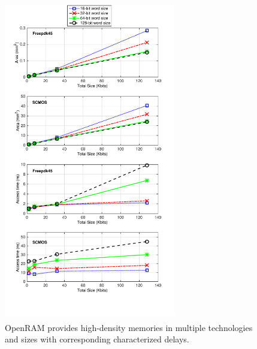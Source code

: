 \begin{figure}[tb]
\begin{center}
\centering
\includegraphics[width=7.5cm , height=14cm]{./figs/Results2.pdf}
  \caption{OpenRAM provides high-density memories in multiple
    technologies and sizes with corresponding characterized
    delays. \label{fig:density_figure}}
  \vspace{-0.5cm}
\end{center}
\end{figure}


